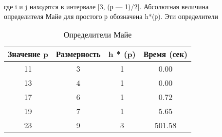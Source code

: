 \documentclass{../../template/mai_book}
\begin{document}
где i и j находятся в интервале [3, (р — 1)/2]. Абсолютная величина
определителя Майе для простого р обозначена h*(р). Эти определители

\begin{wraptable}{l}{10cm}
\begin{tabular}{|c|c|c|c|}
\hline
Значение p & Размерность & h * (p) & Время (сек) \\ \hline
11 & 3 & 1 & 0.00 \\
13 & 4 & 1 & 0.00 \\
17 & 6 & 1 & 0.72 \\
19 & 7 & 1 & 5.65 \\
23 & 9 & 3 & 501.58 \\ \hline
\end{tabular}
\caption{Определители Майе}
\end{wraptable} 
\end{document}
